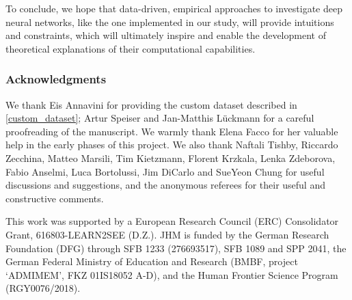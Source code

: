 \documentclass{article}
\begin{document}
To conclude, we hope that data-driven, empirical approaches to investigate deep neural networks, like the one implemented in our study, will provide intuitions and constraints, which will ultimately inspire and enable the development of theoretical explanations of their computational capabilities. 

\clearpage

\subsubsection*{Acknowledgments}

We thank Eis Annavini for providing the custom dataset described in \ref{custom_dataset}; Artur Speiser and Jan-Matthis Lückmann for a careful proofreading of the manuscript. We warmly thank Elena Facco for her valuable help in the early phases of this project. We also thank Naftali Tishby, Riccardo Zecchina, Matteo Marsili, Tim Kietzmann, Florent Krzkala, Lenka Zdeborova, Fabio Anselmi, Luca Bortolussi, Jim DiCarlo and SueYeon Chung for useful discussions and suggestions, and the anonymous referees for their useful and constructive comments.

This work was supported by a European Research Council (ERC) Consolidator Grant, 616803-LEARN2SEE (D.Z.). JHM is funded by the German Research Foundation (DFG) through  SFB 1233 (276693517), SFB 1089 and SPP 2041, the German Federal Ministry of Education and Research (BMBF, project `ADMIMEM', FKZ 01IS18052 A-D), and the Human Frontier Science Program (RGY0076/2018).


%
%
\end{document}
